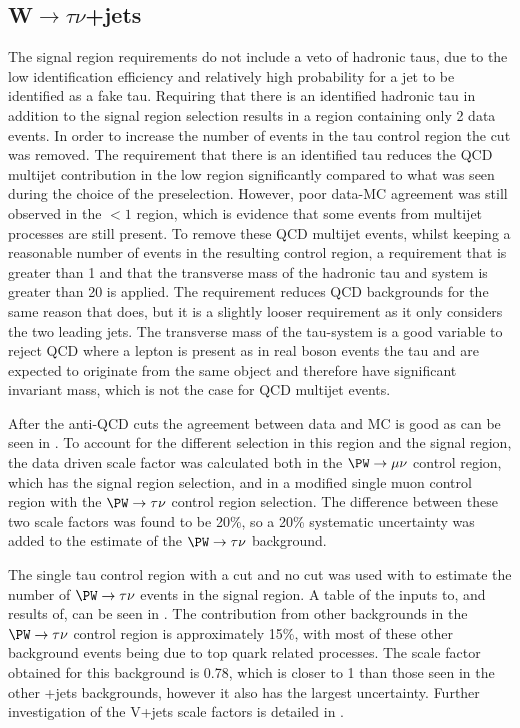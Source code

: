 \subsection{W$\rightarrow \tau\nu$+jets}
\label{sec:parkedwtaunu}
The signal region requirements do not include a veto of hadronic taus, due to the low identification efficiency and relatively high probability for a jet to be identified as a fake tau. Requiring that there is an identified hadronic tau in addition to the signal region selection results in a region containing only 2 data events. In order to increase the number of events in the tau control region the \jetmetdphi cut was removed. The requirement that there is an identified tau reduces the \ac{QCD} multijet contribution in the low \jetmetdphi region significantly compared to what was seen during the choice of the preselection. However, poor data-\ac{MC} agreement was still observed in the \jetmetdphi$<1$ region, which is evidence that some events from multijet processes are still present. To remove these \ac{QCD} multijet events, whilst keeping a reasonable number of events in the resulting control region, a requirement that \jetmetdphileading is greater than 1 and that the transverse mass of the hadronic tau and \MET system is greater than 20 \GeV is applied. The \jetmetdphileading requirement reduces \ac{QCD} backgrounds for the same reason that \jetmetdphi does, but it is a slightly looser requirement as it only considers the two leading jets. The transverse mass of the tau-\MET system is a good variable to reject \ac{QCD} where a lepton is present as in real \PW boson events the tau and \MET are expected to originate from the same object and therefore have significant invariant mass, which is not the case for \ac{QCD} multijet events.

After the anti-\ac{QCD} cuts the agreement between data and \ac{MC} is good as can be seen in . To account for the different \jetmetdphi selection in this region and the signal region, the data driven scale factor was calculated both in the $\PW\rightarrow\mu\nu$ control region, which has the signal region \jetmetdphi selection, and in a modified single muon control region with the $\PW\rightarrow\tau\nu$ control region \jetmetdphi selection. The difference between these two scale factors was found to be 20\%, so a 20\% systematic uncertainty was added to the estimate of the $\PW\rightarrow\tau\nu$ background.

The single tau control region with a \jetmetdphileading cut and no \jetmetdphi cut was used with  to estimate the number of $\PW\rightarrow\tau\nu$ events in the signal region. A table of the inputs to, and results of,  can be seen in . The contribution from other backgrounds in the $\PW\rightarrow\tau\nu$ control region is approximately 15\%, with most of these other background events being due to top quark related processes. The scale factor obtained for this background is 0.78, which is closer to 1 than those seen in the other \PW+jets backgrounds, however it also has the largest uncertainty. Further investigation of the V+jets scale factors is detailed in .

